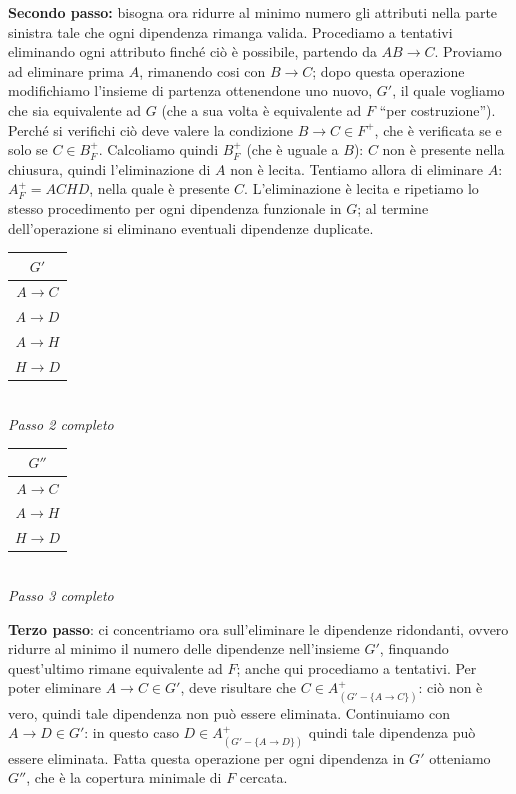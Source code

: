\begin{exmp}
\noindent \textbf{Secondo passo:} bisogna ora ridurre al minimo numero gli attributi nella parte sinistra tale che ogni dipendenza
rimanga valida. Procediamo a tentativi eliminando ogni attributo finché ciò è possibile, partendo da $AB\rightarrow C$. Proviamo 
ad eliminare prima $A$, rimanendo cosi con $B\rightarrow C$; dopo questa operazione modifichiamo l'insieme di partenza ottenendone
uno nuovo, $G'$, il quale vogliamo che sia equivalente ad $G$ (che a sua volta è equivalente ad $F$ ``per costruzione'').\\
Perché si verifichi ciò deve valere la condizione $B\rightarrow C \in F^+$, che è verificata se e solo se $C \in B^+_F$.
Calcoliamo quindi $B^+_F$ (che è uguale a $B$): $C$ non è presente nella chiusura, quindi l'eliminazione di $A$ non è 
lecita. Tentiamo allora di eliminare $A$: $A^+_F=ACHD$, nella quale è presente $C$. L'eliminazione è lecita e ripetiamo lo stesso
procedimento per ogni dipendenza funzionale in $G$; al termine dell'operazione si eliminano eventuali dipendenze duplicate.
\begin{multicols}{2}
\begin{multicols}{2}
\begin{tabular}{|c|}
  \hline
  $G'$\\
  \hline
  $A\rightarrow C$\\
  $A\rightarrow D$\\
  $A\rightarrow H$\\
  $H\rightarrow D$\\
  \hline
 \end{tabular}\\
 
 \emph{\small Passo 2 completo}\\
 
 \begin{tabular}{|c|}
  \hline
  $G''$\\
  \hline
  $A\rightarrow C$\\
  $A\rightarrow H$\\
  $H\rightarrow D$\\
  \hline
 \end{tabular}\\
 
 \emph{\small Passo 3 completo}\\
\end{multicols}
\end{multicols}

\noindent \textbf{Terzo passo}: ci concentriamo ora sull'eliminare le dipendenze ridondanti, ovvero ridurre al minimo il numero
delle dipendenze nell'insieme $G'$, finquando quest'ultimo rimane equivalente ad $F$; anche qui procediamo a tentativi. Per poter
eliminare $A\rightarrow C \in G'$, deve risultare che $C \in A^+_{(G'-\{A\rightarrow C\})}$: ciò non è vero, quindi tale dipendenza
non può essere eliminata. Continuiamo con $A\rightarrow D \in G'$: in questo caso $D \in A^+_{(G'-\{A\rightarrow D\})}$ quindi tale 
dipendenza può essere eliminata. Fatta questa operazione per ogni dipendenza in $G'$ otteniamo $G''$, che è la copertura minimale di
$F$ cercata.
\end{exmp}


